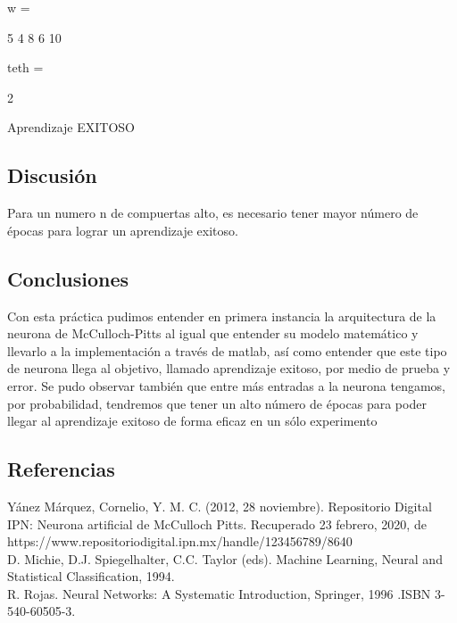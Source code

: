 \documentclass[]{article}
\begin{document}
w =

5     4     8     6    10


teth =

2

Aprendizaje EXITOSO
\subsection{Discusión}
Para un numero n de compuertas alto, es necesario tener mayor número de épocas para lograr un aprendizaje exitoso.
\subsection{Conclusiones}
Con esta práctica pudimos entender en primera instancia la arquitectura de la neurona de McCulloch-Pitts al igual que entender su modelo matemático y llevarlo a la implementación a través de matlab, así como entender que este tipo de neurona llega al objetivo, llamado aprendizaje exitoso, por medio de prueba y error. Se pudo observar también que entre más entradas a la neurona tengamos, por probabilidad, tendremos que tener un alto número de épocas para poder llegar al aprendizaje exitoso de forma eficaz en un sólo experimento
\subsection{Referencias}
Yánez Márquez, Cornelio, Y. M. C. (2012, 28 noviembre). Repositorio Digital IPN: Neurona artificial de McCulloch Pitts. Recuperado 23 febrero, 2020, de https://www.repositoriodigital.ipn.mx/handle/123456789/8640\\
D. Michie, D.J. Spiegelhalter, C.C. Taylor (eds). Machine Learning, Neural and Statistical Classification, 1994.\\
R. Rojas. Neural Networks: A Systematic Introduction, Springer, 1996 .ISBN 3-540-60505-3.
\end{document}
